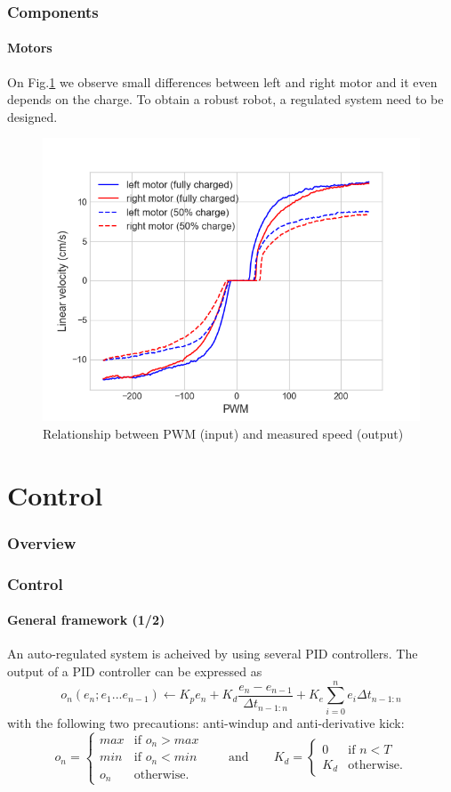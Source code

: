 \documentclass[10pt]{beamer}
\begin{document}
\begin{frame}
\frametitle{Components}
\framesubtitle{Motors}
On Fig.\ref{fig:pwm-speed} we observe small differences between left and right motor and it even depends on the charge. To obtain a robust robot, a regulated system need to be designed.
\begin{figure}[hbtp]
\centering
\label{fig:pwm-speed}
\includegraphics[scale=0.45]{figures/motors_merged.png}
\caption{Relationship between PWM (input) and measured speed (output)}
\end{figure}
\end{frame}


\section{Control} 

\begin{frame}
\frametitle{Overview}
\tableofcontents[currentsection,subsectionstyle=shaded]
\end{frame}

\begin{frame}
\frametitle{Control}
\framesubtitle{General framework (1/2)}
An auto-regulated system is acheived by using several PID controllers. The output of a PID controller can be expressed as
$$ 
o_n (e_n;e_1...e_{n-1}) \leftarrow K_p e_n + K_d\frac{e_n - e_{n-1}}{\Delta t_{n-1:n}} + K_e\sum_{i=0}^{n}{e_i \Delta t_{n-1:n}}
$$
with the following two precautions: anti-windup and anti-derivative kick:
$$
o_n = \left\{
    \begin{array}{ll}
        max & \mbox{if } o_n > max \\
        min & \mbox{if } o_n < min \\
        o_n & \mbox{otherwise.}
    \end{array}
\right.
\qquad\text{and}\qquad	
K_d = \left\{
    \begin{array}{ll}
        0 & \mbox{if } n < T \\
       K_d & \mbox{otherwise.}
    \end{array}
\right.
$$
\end{frame}
\end{document}
